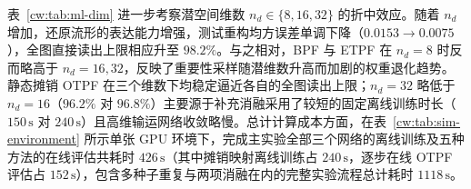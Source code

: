 表~\ref{cw:tab:ml-dim} 进一步考察潜空间维数 $n_d\in\{8,16,32\}$ 的折中效应。随着 $n_d$ 增加，还原流形的表达能力增强，测试重构均方误差单调下降（$0.0153\to0.0075$），全图直接读出上限相应升至 $98.2\%$。与之相对，BPF 与 ETPF 在 $n_d=8$ 时反而略高于 $n_d=16,32$，反映了重要性采样随潜维数升高而加剧的权重退化趋势。静态摊销 OTPF 在三个维数下均稳定逼近各自的全图读出上限；$n_d=32$ 略低于 $n_d=16$（$96.2\%$ 对 $96.8\%$）主要源于补充消融采用了较短的固定离线训练时长（$150\,\mathrm{s}$ 对 $240\,\mathrm{s}$）且高维输运网络收敛略慢。总计计算成本方面，在表~\ref{cw:tab:sim-environment} 所示单张 GPU 环境下，完成主实验全部三个网络的离线训练及五种方法的在线评估共耗时 $426\,\mathrm{s}$（其中摊销映射离线训练占 $240\,\mathrm{s}$，逐步在线 OTPF 评估占 $152\,\mathrm{s}$），包含多种子重复与两项消融在内的完整实验流程总计耗时 $1118\,\mathrm{s}$。
